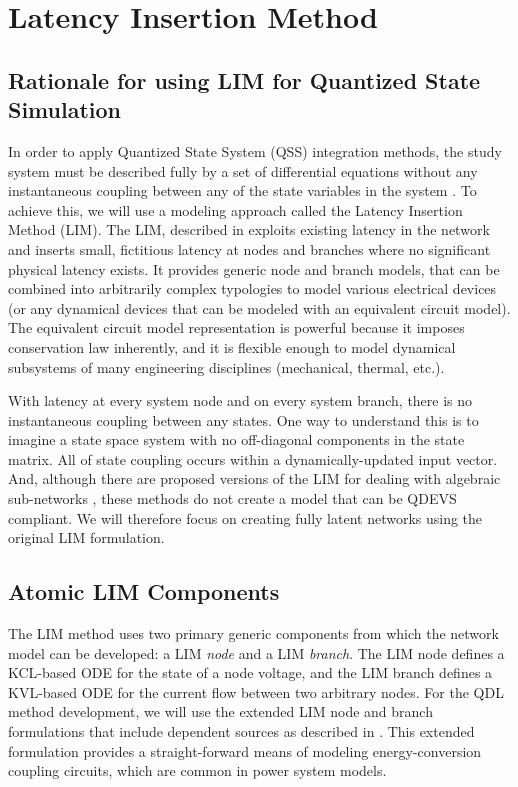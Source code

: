 
\chapter{Latency Insertion Method}\label{chap:lim}
    
\section{Rationale for using LIM for Quantized State Simulation}

In order to apply Quantized State System (QSS) integration methods, the study system must be described fully by a set of differential equations without any instantaneous coupling between any of the state variables in the system \cite{cellier2008}. To achieve this, we will use a modeling approach called the Latency Insertion Method (LIM). The LIM, described in \cite{schutt2001} exploits existing latency in the network and inserts small, fictitious latency at nodes and branches where no significant physical latency exists. It provides generic node and branch models, that can be combined into arbitrarily complex typologies to model various electrical devices (or any dynamical devices that can be modeled with an equivalent circuit model). The equivalent circuit model representation is powerful because it imposes conservation law inherently, and it is flexible enough to model dynamical subsystems of many engineering disciplines (mechanical, thermal, etc.). 

With latency at every system node and on every system branch, there is no instantaneous coupling between any states. One way to understand this is to imagine a state space system with no off-diagonal components in the state matrix. All of state coupling occurs within a dynamically-updated input vector. And, although there are proposed versions of the LIM for dealing with algebraic sub-networks \cite{sekine2009}, these methods do not create a model that can be QDEVS compliant. We will therefore focus on creating fully latent networks using the original LIM formulation. 

\section{Atomic LIM Components}

The LIM method uses two primary generic components from which the network model can be developed: a LIM \emph{node} and a LIM \emph{branch}. The LIM node defines a KCL-based ODE for the state of a node voltage, and the LIM branch defines a KVL-based ODE for the current flow between two arbitrary nodes. For the QDL method development, we will use the extended LIM node and branch formulations that include dependent sources as described in \cite{goh2011}. This extended formulation provides a straight-forward means of modeling energy-conversion coupling circuits, which are common in power system models.

